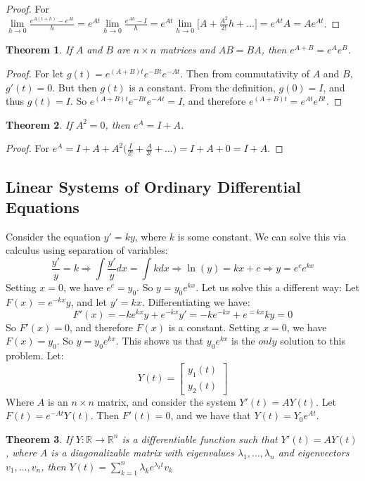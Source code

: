 \documentclass{article}
\theoremstyle{mystyle}
\newtheorem{theorem}{Theorem}[section]
\begin{document}
\begin{proof}
For $\underset{h\rightarrow 0}\lim \frac{e^{A(t+h)}-e^{At}}{h} = e^{At}\underset{h\rightarrow 0}\lim \frac{e^{Ah}-I}{h} = e^{At}\underset{h\rightarrow 0}\lim\big[A+\frac{A^2}{2!}h+\hdots\big] = e^{At}A = Ae^{At}$.
\end{proof}
\begin{theorem}
If $A$ and $B$ are $n\times n$ matrices and $AB=BA$, then $e^{A+B} = e^{A}e^{B}$.
\end{theorem}
\begin{proof}
For let $g(t) = e^{(A+B)t}e^{-Bt}e^{-At}$. Then from commutativity of $A$ and $B$, $g'(t) = 0$. But then $g(t)$ is a constant. From the definition, $g(0) = I$, and thus $g(t) = I$. So $e^{(A+B)t}e^{-Bt}e^{-At} = I$, and therefore $e^{(A+B)t} = e^{At}e^{Bt}$.
\end{proof}
\begin{theorem}
If $A^{2} = 0$, then $e^{A} = I+A$.
\end{theorem}
\begin{proof}
For $e^{A} = I+A+A^{2}\big(\frac{I}{2!}+\frac{A}{3!}+\hdots\big) = I+A+0 = I+A$.
\end{proof}
\subsection{Linear Systems of Ordinary Differential Equations}
Consider the equation $y' = ky$, where $k$ is some constant. We can solve this via calculus using separation of variables:
\begin{equation*}
    \frac{y'}{y} = k\Rightarrow \int \frac{y'}{y}dx = \int kdx \Rightarrow \ln(y) = kx+c \Rightarrow y = e^c e^{kx}    
\end{equation*}
Setting $x=0$, we have $e^c = y_0$. So $y = y_0e^{kx}$. Let us solve this a different way: Let $F(x) = e^{-kx}y$, and let $y'=kx$. Differentiating we have:
\begin{equation*}
    F'(x) = -ke^{kx}y + e^{-kx}y' = -ke^{-kx}+e^{=kx}ky = 0    
\end{equation*}
So $F'(x) = 0$, and therefore $F(x)$ is a constant. Setting $x=0$, we have $F(x) = y_0$. So $y = y_0e^{kx}$. This shows us that $y_0e^{kx}$ is the $only$ solution to this problem. Let:
\begin{equation*}
    Y(t) = \begin{bmatrix} y_1(t) \\ y_2(t)\end{bmatrix}    
\end{equation*}
Where $A$ is an $n\times n$ matrix, and consider the system $Y'(t) = AY(t)$. Let $F(t) = e^{-At}Y(t)$. Then $F'(t) = 0$, and we have that $Y(t) = Y_0 e^{At}$.
\begin{theorem}
If $Y:\mathbb{R}\rightarrow \mathbb{R}^n$ is a differentiable function such that $Y'(t) = AY(t)$, where $A$ is a diagonalizable matrix with eigenvalues $\lambda_1,\hdots, \lambda_n$ and eigenvectors $v_1,\hdots, v_n$, then $Y(t) = \sum_{k=1}^{n} \lambda_k e^{\lambda_k t}v_k$
\end{theorem}
\end{document}
